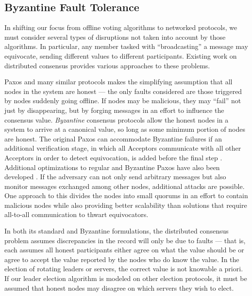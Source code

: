   \subsection{Byzantine Fault Tolerance}
    In shifting our focus from offline voting algorithms to networked protocols,
    we must consider several types of disruptions not taken into account by
    those algorithms. In particular, any member tasked with ``broadcasting'' a
    message may equivocate, sending different values to different participants.
    Existing work on distributed consensus provides various approaches to these
    problems.

    Paxos and many similar protocols makes the simplifying assumption that all
    nodes in the system are honest --- the only faults considered are those
    triggered by nodes suddenly going offline. If nodes may be malicious, they
    may ``fail'' not just by disappearing, but by forging messages in an effort
    to influence the consensus value. \emph{Byzantine} consensus protocols allow
    the honest nodes in a system to arrive at a canonical value, so long as some
    minimum portion of nodes are honest. The original Paxos can
    accommodate Byzantine failures if an additional verification stage, in which
    all Acceptors communicate with all other Acceptors in order to detect
    equivocation, is added before the final step \cite{castro_practical_1999}.
    Additional optimizations to regular and Byzantine Paxos have also been
    developed \cite{lamport_fast_2006}. If the adversary can not only send
    arbitrary messages but also monitor messages exchanged among other nodes,
    additional attacks are possible. One approach to this divides the nodes into
    small quorums in an effort to contain malicious nodes \cite{king_load_2011}
    while also providing better scalability than solutions that require
    all-to-all communication to thwart equivocators.

    In both its standard and Byzantine formulations, the distributed consensus
    problem assumes discrepancies in the record will only be due to faults ---
    that is, each assumes all honest participants either agree on what the value
    should be or agree to accept the value reported by the nodes who do know the
    value.  In the election of rotating leaders or servers, the correct value is
    not knowable a priori. If our leader election algorithm is modeled on other
    election protocols, it must be assumed that honest nodes may disagree on
    which servers they wish to elect.

